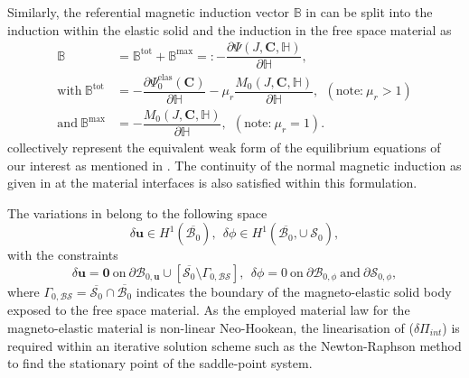 \documentclass[11pt,a4paper,final]{article}
\begin{document}
Similarly, the referential magnetic induction vector $\mathbb{B}$ in  can be split into the induction within the elastic solid and the induction in the free space material as
\begin{align}
\mathbb{B} &= \mathbb{B}^{\text{tot}} + \mathbb{B}^{\text{max}} =: -\dfrac{\partial \Psi (J, \mathbf{C}, \mathbb{H})}{\partial \mathbb{H}}, \\
\text{with} \ \mathbb{B}^{\text{tot}} &= -\dfrac{\partial \Psi_0^{\text{elas}} (\mathbf{C})}{\partial \mathbb{H}} - \mu_r \dfrac{M_0 (J, \mathbf{C}, \mathbb{H})}{\partial \mathbb{H}}, \ \ (\text{note:} \ \mu_r > 1)\\
\text{and} \ \mathbb{B}^{\text{max}} &= -\dfrac{M_0 (J, \mathbf{C}, \mathbb{H})}{\partial \mathbb{H}}, \ \ (\text{note:} \ \mu_r = 1).
\end{align}
 collectively represent the equivalent weak form of the equilibrium equations of our interest as mentioned in . The continuity of the normal magnetic induction as given in  at the material interfaces is also satisfied within this formulation. \par 

\noindent The variations in  belong to the following space
\begin{equation}
\delta \mathbf{u} \in H^1 (\overline{\mathcal{B}_0}), \ \ \delta \phi \in H^1 (\overline{\mathcal{B}_0}, \cup \ \mathcal{S}_0),
\end{equation}
with the constraints 
\begin{equation}
\delta \mathbf{u} = \mathbf{0} \ \text{on} \ \partial \mathcal{B}_{0,\mathbf{u}} \cup \left[ \overline{\mathcal{S}_0} \setminus \Gamma_{0, \mathcal{BS}} \right], \ \ \delta \phi = 0 \ \text{on} \ \partial \mathcal{B}_{0,\phi} \ \text{and} \ \partial \mathcal{S}_{0,\phi},
\end{equation}
where $\Gamma_{0, \mathcal{BS}} = \overline{\mathcal{S}_0} \cap \overline{\mathcal{B}_0}$ indicates the boundary of the magneto-elastic solid body exposed to the free space material. As the employed material law for the magneto-elastic material is non-linear Neo-Hookean, the linearisation of  ($\delta \Pi_{int}$) is required within an iterative solution scheme such as the Newton-Raphson method to find the stationary point of the saddle-point system. 
\end{document}

